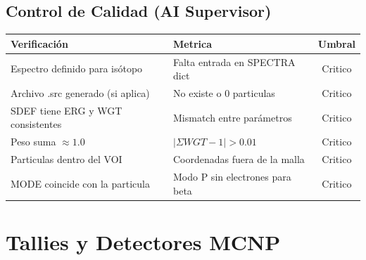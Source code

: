 \documentclass[12pt,a4paper]{article}
\begin{document}
\begin{tcolorbox}[aiSupervisor]

\begin{tcolorbox}[aiSupervisor]
\subsection*{Control de Calidad (AI Supervisor)}

\begin{table}[H]
\centering
\begin{tabular}{llc}
\toprule
\textbf{Verificación} & \textbf{Metrica} & \textbf{Umbral} \\
\midrule
Espectro definido para isótopo & Falta entrada en SPECTRA dict & Critico \\
Archivo .src generado (si aplica) & No existe o 0 particulas & Critico \\
SDEF tiene ERG y WGT consistentes & Mismatch entre parámetros & Critico \\
Peso suma $\approx 1.0$ & $|\Sigma WGT - 1| > 0.01$ & Critico \\
Particulas dentro del VOI & Coordenadas fuera de la malla & Critico \\
MODE coincide con la particula & Modo P sin electrones para beta & Critico \\
\bottomrule
\end{tabular}
\end{table}

\newpage


\newpage


\newpage


\newpage

\end{tcolorbox}
\end{tcolorbox}
\section{Tallies y Detectores MCNP}
\label{sec:tallies}
\end{document}
